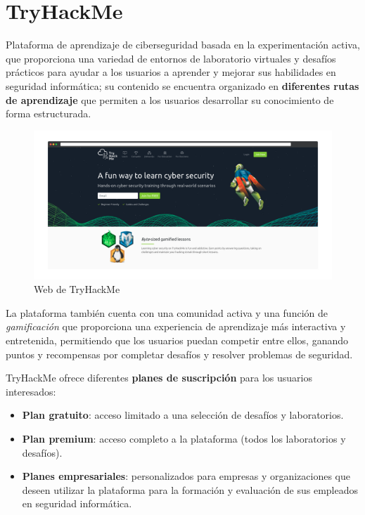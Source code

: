     
    \section{TryHackMe}
    
        Plataforma de aprendizaje de ciberseguridad basada en la experimentación activa, que proporciona una variedad de entornos de laboratorio virtuales y desafíos prácticos para ayudar a los usuarios a aprender y mejorar sus habilidades en seguridad informática; su contenido se encuentra organizado en \textbf{diferentes rutas de aprendizaje} que permiten a los usuarios desarrollar su conocimiento de forma estructurada.
        
        \begin{figure}[h]
            \centering
            \includegraphics[width=\textwidth]{images/Capturas/Web de THM.png}
            \caption{Web de TryHackMe}
            \label{fig:THM-web}
        \end{figure}
        
        La plataforma también cuenta con una comunidad activa y una función de \textit{gamificación} que proporciona una experiencia de aprendizaje más interactiva y entretenida, permitiendo que los usuarios puedan competir entre ellos, ganando puntos y recompensas por completar desafíos y resolver problemas de seguridad.
        
        TryHackMe ofrece diferentes \textbf{planes de suscripción} para los usuarios interesados:
        
        \begin{itemize}
            \item \textbf{Plan gratuito}: acceso limitado a una selección de desafíos y laboratorios.
        
            \item \textbf{Plan premium}: acceso completo a la plataforma (todos los laboratorios y desafíos).
        
            \item \textbf{Planes empresariales}: personalizados para empresas y organizaciones que deseen utilizar la plataforma para la formación y evaluación de sus empleados en seguridad informática.
        \end{itemize}
        
